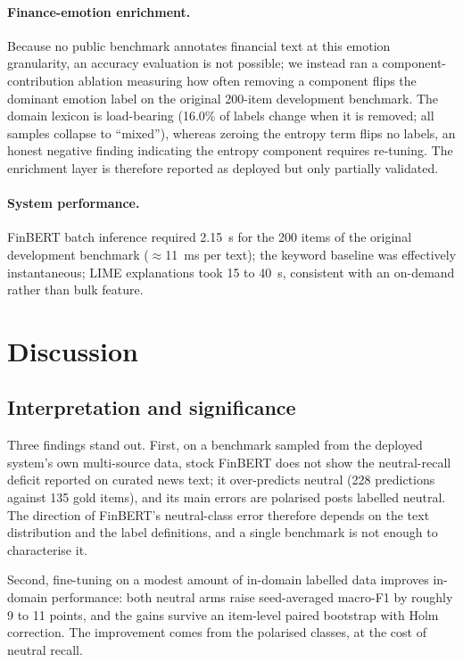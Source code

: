 \documentclass{aims}
\numberwithin{equation}{section}
\begin{document}
\paragraph{Finance-emotion enrichment.}
Because no public benchmark annotates financial text at this emotion granularity, an
accuracy evaluation is not possible; we instead ran a component-contribution
ablation measuring how often removing a component flips the dominant emotion label on
the original 200-item development benchmark. The domain lexicon is load-bearing (16.0\% of labels change
when it is removed; all samples collapse to ``mixed''), whereas zeroing the entropy
term flips no labels, an honest negative finding indicating the entropy component
requires re-tuning. The enrichment layer is therefore reported as deployed but only
partially validated.

\paragraph{System performance.}
FinBERT batch inference required 2.15~s for the 200 items of the original development benchmark ($\approx$11~ms per text);
the keyword baseline was effectively instantaneous; LIME explanations took 15 to
40~s, consistent with an on-demand rather than bulk feature.

\section{Discussion}\label{sec:discussion}
\subsection{Interpretation and significance}
Three findings stand out. First, on a benchmark sampled from the deployed system's
own multi-source data, stock FinBERT does not show the neutral-recall deficit
reported on curated news text; it over-predicts neutral (228 predictions against 135
gold items), and its main errors are polarised posts labelled neutral. The
direction of FinBERT's neutral-class error therefore depends on the text
distribution and the label definitions, and a single benchmark is not enough to
characterise it.

Second, fine-tuning on a modest amount of in-domain labelled data improves in-domain
performance: both neutral arms raise seed-averaged macro-F1 by roughly 9 to 11
points, and the gains survive an item-level paired bootstrap with Holm correction.
The improvement comes from the polarised classes, at the cost of neutral recall.
\end{document}
